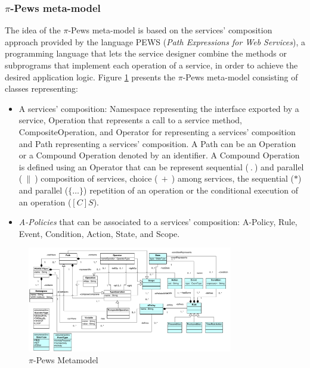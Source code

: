 \subsubsection{$\pi$-{\sc Pews}  meta-model}\label{sec:pewsmetamodel}
The idea of the $\pi$-{\sc Pews} meta-model is based on the services' composition approach provided by the language PEWS\cite{BaAM06,Placido2010LTPD} (\textit{Path Expressions for Web Services}), a programming language that lets the service designer  combine the methods or subprograms that
implement each operation of a service, in order to achieve the desired application logic. Figure \ref{fig:metamodel} presents the $\pi$-{\sc Pews} meta-model
consisting of  classes representing:
\begin{itemize}
\item A services' composition: {\sc Namespace} representing the interface exported by a service, {\sc Operation} that represents a call to a service method, {\sc CompositeOperation}, and  {\sc Operator} for representing a services' composition and {\sc Path} representing a services' composition.
A {\sc Path} can be an {\sc Operation} or a {\sc Compound Operation}
denoted by an identifier. A {\sc Compound Operation} is defined using an  {\sc Operator}  that can be represent  sequential ($\ . \ $) and parallel ($\ \| \ $) composition of services,
 choice ($\ + \ $) among services,
the sequential ($*$) and parallel ($\{\dots\}$) repetition of an operation or the conditional execution of an operation ($[C]S$).

\item {\em A-Policies} that can be associated to a services' composition:  {\sc A-Policy}, {\sc Rule}, {\sc Event}, {\sc Condition}, {\sc Action}, {\sc State}, and {\sc Scope}.
\end{itemize}
%
\begin{figure}
\centering
\includegraphics[width=0.80\textwidth]{figs/PEWSMetamodel}
\caption{$\pi$-{\sc Pews} Metamodel}
\label{fig:metamodel}
\end{figure}

